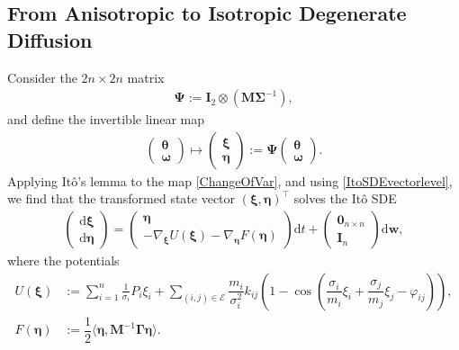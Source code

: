\documentclass[10pt,twocolumn]{IEEEtran}
\begin{document}
\subsection{From Anisotropic to Isotropic Degenerate Diffusion}\label{subsec:FromAnisoToIso}
Consider the $2n\times 2n$ matrix
\begin{align}
\bm{\Psi}:= \bm{I}_{2} \otimes \left(\bm{M}\bm{\Sigma}^{-1}\right), \label{DefPsi}	
\end{align}
and define the invertible linear map
\begin{align}
\begin{pmatrix}
\bm{\theta}\\
\bm{\omega}	
\end{pmatrix} \mapsto \begin{pmatrix}
\bm{\xi}\\
\bm{\eta}	
\end{pmatrix} := \bm{\Psi} \begin{pmatrix}
\bm{\theta}\\
\bm{\omega}	
\end{pmatrix}. \label{ChangeOfVar}
\end{align}
Applying It\^{o}'s lemma \cite[Ch. 4.2]{oksendal2013stochastic} to the map \eqref{ChangeOfVar}, and using \eqref{ItoSDEvectorlevel}, we find that the transformed state vector $(\bm{\xi},\bm{\eta})^{\top}$ solves the It\^{o} SDE 
\begin{align}
\begin{pmatrix}
{\mathrm{d}}\bm{\xi}\\
{\mathrm{d}}\bm{\eta}	
\end{pmatrix}
\! = \!\begin{pmatrix}
\bm{\eta}\\
-\nabla_{\bm{\xi}}U(\bm{\xi}) -\nabla_{\bm{\eta}}F\left(\bm{\eta}\right)  	
\end{pmatrix}{\mathrm{d}}t + \!\begin{pmatrix}
 \bm{0}_{n\times n}\\
 \bm{I}_{n}	
 \end{pmatrix}{\mathrm{d}}\bm{w},
\label{XiEtaVectorSDE}	
\end{align}
where the potentials
{\small{\begin{subequations}
\begin{align}
U(\bm{\xi}) &:= \!\displaystyle\sum_{i=1}^{n}\!\frac{1}{\sigma_{i}}P_{i}\xi_{i} + \!\!\!\! \displaystyle\sum_{(i,j)\in\mathcal{E}}\!\!\dfrac{m_{i}}{\sigma_{i}^{2}}k_{ij}\!\left(\!1 \!- \!\cos\!\left(\!\dfrac{\sigma_{i}}{m_{i}}\xi_{i} + \dfrac{\sigma_{j}}{m_{j}}\xi_{j} - \varphi_{ij}\!\!\right)\!\right), \label{defU}\\
F(\bm{\eta}) &:= \dfrac{1}{2}\langle\bm{\eta},\bm{M}^{-1}\bm{\Gamma}\bm{\eta}\rangle. \label{defF}	
\end{align}
\label{NewPotentials}	
\end{subequations}}}
\end{document}
